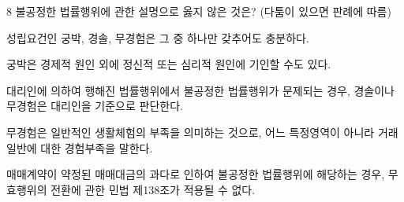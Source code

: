 \begin{question}{8}
불공정한 법률행위에 관한 설명으로 옳지 않은 것은? (다툼이 있으면 판례에 따름)
\begin{choices}
  \item 성립요건인 궁박, 경솔, 무경험은 그 중 하나만 갖추어도 충분하다.
  \item 궁박은 경제적 원인 외에 정신적 또는 심리적 원인에 기인할 수도 있다.
  \item 대리인에 의하여 행해진 법률행위에서 불공정한 법률행위가 문제되는 경우, 경솔이나 무경험은 대리인을 기준으로 판단한다.
  \item 무경험은 일반적인 생활체험의 부족을 의미하는 것으로, 어느 특정영역이 아니라 거래 일반에 대한 경험부족을 말한다.
  \item 매매계약이 약정된 매매대금의 과다로 인하여 불공정한 법률행위에 해당하는 경우, 무효행위의 전환에 관한 민법 제138조가 적용될 수 없다.
\end{choices}
\end{question}
